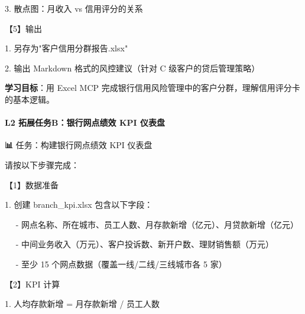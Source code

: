 \documentclass[
  american,
  chinese,
]{ctexart}
\begin{document}
\foreignlanguage{american}{3. }{散点图：月收入}\foreignlanguage{american}{ vs }{信用评分的关系}\foreignlanguage{american}{}

{【}\foreignlanguage{american}{5}{】输出}\foreignlanguage{american}{}

\foreignlanguage{american}{1. }{另存为}{"}{客户信用分群报告}\foreignlanguage{american}{.xlsx"}

\foreignlanguage{american}{2. }{输出}\foreignlanguage{american}{ Markdown }{格式的风控建议（针对}\foreignlanguage{american}{ C }{级客户的贷后管理策略）}\foreignlanguage{american}{}

\textbf{{学习目标}}{：用}\foreignlanguage{american}{ Excel MCP }{完成银行信用风险管理中的客户分群，理解信用评分卡的基本逻辑。}\foreignlanguage{american}{}

\paragraph{\texorpdfstring{\foreignlanguage{american}{L2 }{拓展任务B：银行网点绩效}\foreignlanguage{american}{ KPI }{仪表盘}}{L2 拓展任务B：银行网点绩效 KPI 仪表盘}}\label{l2-ext-b-kpi}

\foreignlanguage{american}{\textbf{📊 }}{任务：构建银行网点绩效}\foreignlanguage{american}{ KPI }{仪表盘}\foreignlanguage{american}{}

{请按以下步骤完成：}\foreignlanguage{american}{}

{【}\foreignlanguage{american}{1}{】数据准备}\foreignlanguage{american}{}

\foreignlanguage{american}{1. }{创建}\foreignlanguage{american}{ branch\_kpi.xlsx}{ }{包含以下字段：}\foreignlanguage{american}{}

\foreignlanguage{american}{{~~ }- }{网点名称、所在城市、员工人数、月存款新增（亿元）、月贷款新增（亿元）}\foreignlanguage{american}{}

\foreignlanguage{american}{{~~ }- }{中间业务收入（万元）、客户投诉数、新开户数、理财销售额（万元）}\foreignlanguage{american}{}

\foreignlanguage{american}{{~~ }- }{至少}\foreignlanguage{american}{ 15 }{个网点数据（覆盖一线/二线/三线城市各}\foreignlanguage{american}{ 5 }{家）}\foreignlanguage{american}{}

{【}\foreignlanguage{american}{2}{】}\foreignlanguage{american}{KPI }{计算}\foreignlanguage{american}{}

\foreignlanguage{american}{1. }{人均存款新增}\foreignlanguage{american}{ = }{月存款新增}\foreignlanguage{american}{ / }{员工人数}\foreignlanguage{american}{}
\end{document}
